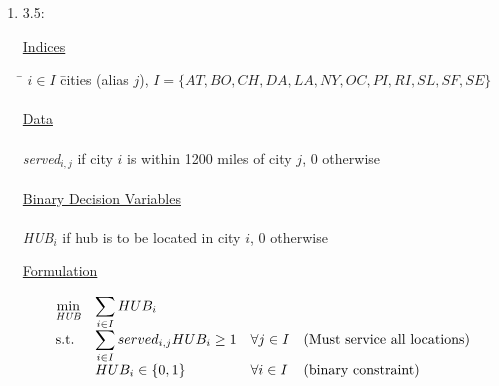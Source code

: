 \documentclass[10pt]{article}
\begin{document}
\begin{enumerate}

  \item 3.5: 

\noindent\underline{Indices}
\begin{tabbing}
\hspace{.5cm} \= $i\in I$ \hspace{2.5cm} \= cities (alias $j$), $I=\{AT, BO, CH, DA, LA, NY, OC, PI, RI, SL, SF, SE \}$ \\


\\
\noindent\underline{Data}\\%
\\
\> {\it served}$_{i,j}$  if city $i$ is within 1200 miles of city $j$, 0 otherwise\\
\\

\noindent\underline{Binary Decision Variables}\\%
\\
\> {\it HUB}$_{i}$  if hub is to be located in city $i$, 0 otherwise  \\
\end{tabbing}


\noindent\underline{Formulation}

 \[
    \begin{array}{llll}
      \displaystyle\min_{ \tiny{\it HUB}} & \displaystyle\sum_{i\in I} HUB_i & \\
      \mbox{s.t.} & \displaystyle\sum_{i\in I} served_{i,j} HUB_{i} \ge 1 &  \forall j \in I & {\rm (Must~service~all~locations)}\\
& HUB_{i} \in \{0,1\} & \forall i\in I & {\rm (binary~constraint)}\\
    \end{array}
    \]



\end{enumerate}
\end{document}
